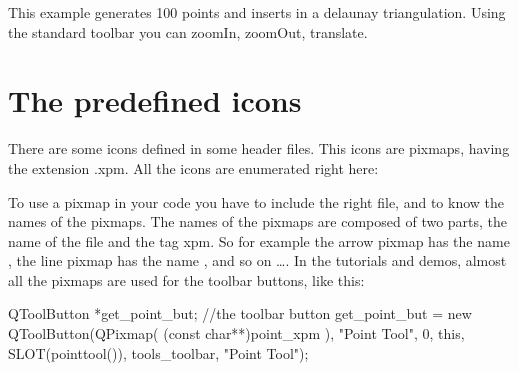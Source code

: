 \ccExample
{}

This example generates 100 points and inserts in a delaunay triangulation. Using the standard toolbar you can zoomIn, zoomOut, translate.

\section{The predefined icons}
\label{The predefined icons}
There are some icons defined in some header files. This icons are pixmaps, having the extension .xpm. All the icons are enumerated right here:















To use a pixmap in your code you have to include the right file, and to know the names of the pixmaps. The names of the pixmaps are composed of two parts, the name of the file and the tag xpm. So for example the arrow pixmap has the name , the line pixmap has the name , and so on \ldots.
In the tutorials and demos, almost all the pixmaps are used for the toolbar buttons, like this:

\ccExample
\begin{ccExampleCode}
    QToolButton *get_point_but;	//the toolbar button
    get_point_but =  new QToolButton(QPixmap( (const char**)point_xpm ),
                                     "Point Tool", 
                                     0, 
                                     this, 
                                     SLOT(pointtool()), 
                                     tools_toolbar, 
                                     "Point Tool");
\end{ccExampleCode}








